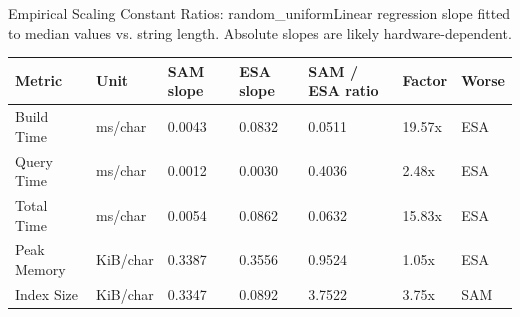 \begin{benchmarktable}{Empirical Scaling Constant Ratios: random\_uniform}{Linear regression slope fitted to median values vs. string length. Absolute slopes are likely hardware-dependent.}
\begin{tabularx}{\textwidth}{|X|X|X|X|X|X|X|}
\toprule
Metric & Unit & SAM slope & ESA slope & SAM / ESA ratio & Factor & Worse \\
\midrule
Build Time & ms/char & 0.0043 & 0.0832 & 0.0511 & 19.57x & ESA \\
Query Time & ms/char & 0.0012 & 0.0030 & 0.4036 & 2.48x & ESA \\
Total Time & ms/char & 0.0054 & 0.0862 & 0.0632 & 15.83x & ESA \\
Peak Memory & KiB/char & 0.3387 & 0.3556 & 0.9524 & 1.05x & ESA \\
Index Size & KiB/char & 0.3347 & 0.0892 & 3.7522 & 3.75x & SAM \\
\bottomrule
\end{tabularx}
\end{benchmarktable}